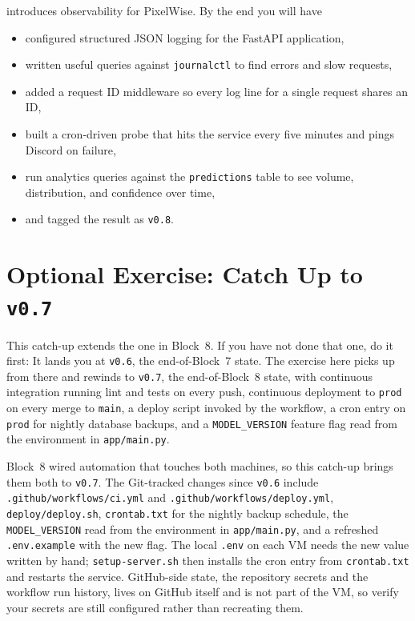  introduces observability for PixelWise.
By the end you will have
\begin{itemize}
    \item configured structured JSON logging for the FastAPI application,
    \item written useful queries against \texttt{journalctl} to find errors and slow requests,
    \item added a request ID middleware so every log line for a single request shares an ID,
    \item built a cron-driven probe that hits the service every five minutes and pings Discord on failure,
    \item run analytics queries against the \texttt{predictions} table to see volume, distribution, and confidence over time,
    \item and tagged the result as \texttt{v0.8}.
\end{itemize}



\newpage
\section{Optional Exercise: Catch Up to \texttt{v0.7}}


This catch-up extends the one in Block~8. If you have not done that one,
do it first: It lands you at \texttt{v0.6}, the end-of-Block~7 state.
The exercise here picks up from there and rewinds to \texttt{v0.7}, the
end-of-Block~8 state, with continuous integration running lint and tests
on every push, continuous deployment to \texttt{prod} on every merge to
\texttt{main}, a deploy script invoked by the workflow, a cron entry on
\texttt{prod} for nightly database backups, and a \texttt{MODEL\_VERSION}
feature flag read from the environment in \texttt{app/main.py}.

 Block~8 wired automation that touches
both machines, so this catch-up brings them both to \texttt{v0.7}. The
Git-tracked changes since \texttt{v0.6} include
\texttt{.github/workflows/ci.yml} and
\texttt{.github/workflows/deploy.yml},
\texttt{deploy/deploy.sh}, \texttt{crontab.txt} for the nightly backup
schedule, the \texttt{MODEL\_VERSION} read from the environment in
\texttt{app/main.py}, and a refreshed \texttt{.env.example} with the new
flag. The local \texttt{.env} on each VM needs the new value written by
hand; \texttt{setup-server.sh} then installs the cron entry from
\texttt{crontab.txt} and restarts the service. GitHub-side state, the
repository secrets and the workflow run history, lives on GitHub itself
and is not part of the VM, so verify your secrets are still configured
rather than recreating them.

